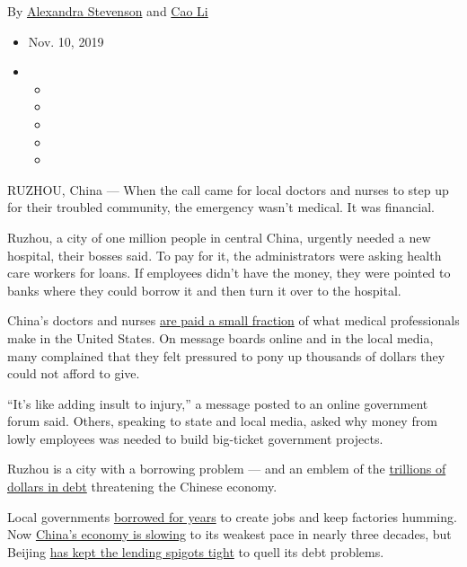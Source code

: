 By \href{https://www.nytimes.com/by/alexandra-stevenson}{Alexandra
Stevenson} and \href{https://www.nytimes.com/by/cao-li}{Cao Li}

\begin{itemize}
\item
  Nov. 10, 2019
\item
  \begin{itemize}
  \item
  \item
  \item
  \item
  \item
  \end{itemize}
\end{itemize}

RUZHOU, China --- When the call came for local doctors and nurses to
step up for their troubled community, the emergency wasn't medical. It
was financial.

Ruzhou, a city of one million people in central China, urgently needed a
new hospital, their bosses said. To pay for it, the administrators were
asking health care workers for loans. If employees didn't have the
money, they were pointed to banks where they could borrow it and then
turn it over to the hospital.

China's doctors and nurses
\href{https://www.nytimes.com/2018/09/30/business/china-health-care-doctors.html}{are
paid a small fraction} of what medical professionals make in the United
States. On message boards online and in the local media, many complained
that they felt pressured to pony up thousands of dollars they could not
afford to give.

``It's like adding insult to injury,'' a message posted to an online
government forum said. Others, speaking to state and local media, asked
why money from lowly employees was needed to build big-ticket government
projects.

Ruzhou is a city with a borrowing problem --- and an emblem of the
\href{https://www.nytimes.com/2017/05/24/business/china-downgrade-explained.html}{trillions
of dollars in debt} threatening the Chinese economy.

Local governments
\href{https://www.nytimes.com/2019/04/10/business/china-economy-debt-tianjin.html}{borrowed
for years} to create jobs and keep factories humming. Now
\href{https://www.nytimes.com/2019/10/17/business/china-economic-growth.html}{China's
economy is slowing} to its weakest pace in nearly three decades, but
Beijing
\href{https://www.nytimes.com/2018/06/14/business/economy/china-economy-debt-interest-rates.html}{has
kept the lending spigots tight} to quell its debt problems.

